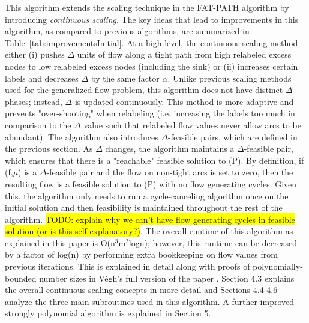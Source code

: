 \documentclass[11pt]{article}
\theoremstyle{definition}
\theoremstyle{definition}
\newcommand{\todo}[1]{\colorbox{yellow}{TODO: #1}}
\begin{document}
This algorithm extends the scaling technique in the FAT-PATH algorithm \cite{Goldberg:1991:CAG:105014.105022} by introducing \textit{continuous scaling}. The key ideas that lead to improvements in this algorithm, as compared to previous algorithms, are summarized in Table~\ref{tab:improvementsInitial}. At a high-level, the continuous scaling method either (i) pushes $\Delta$ units of flow along a tight path from high relabeled excess nodes to low relabeled excess nodes (including the sink) or (ii) increases certain labels and decreases $\Delta$ by the same factor $\alpha$. Unlike previous scaling methods used for the generalized flow problem, this algorithm does not have distinct $\Delta$-phases; instead, $\Delta$ is updated continuously. This method is more adaptive and prevents "over-shooting" when relabeling (i.e. increasing the labels too much in comparison to the $\Delta$ value such that relabeled flow values never allow arcs to be abundant). The algorithm also introduces $\Delta$-feasible pairs, which are defined in the previous section. As $\Delta$ changes, the algorithm maintains a $\Delta$-feasible pair, which ensures that there is a "reachable" feasible solution to (P). By definition, if (f,$\mu$) is a $\Delta$-feasible pair and the flow on non-tight arcs is set to zero, then the resulting flow is a feasible solution to (P) with no flow generating cycles. Given this, the algorithm only needs to run a cycle-canceling algorithm once on the initial solution and then feasibility is maintained throughout the rest of the algorithm. \todo{explain why we can't have flow generating cycles in feasible solution (or is this self-explanatory?)}. The overall runtime of this algorithm as explained in this paper is O(n$^3$m$^2$logn); however, this runtime can be decreased by a factor of log(n) by performing extra bookkeeping on flow values from previous iterations. This is explained in detail along with proofs of polynomially-bounded number sizes in Végh's full version of the paper \cite{article}. Section 4.3 explains the overall continuous scaling concepts in more detail and Sections 4.4-4.6 analyze the three main subroutines used in this algorithm. A further improved strongly polynomial algorithm is explained in Section 5. 
\end{document}

